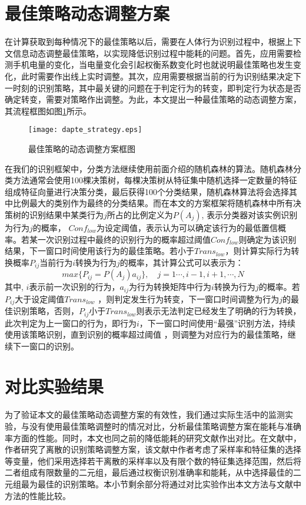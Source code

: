 \section{最佳策略动态调整方案}
\par 在计算获取到每种情况下的最佳策略以后，需要在人体行为识别过程中，根据上下文信息动态调整最佳策略，以实现降低识别过程中能耗的问题。首先，应用需要检测手机电量的变化，当电量变化会引起权衡系数变化时也就说明最佳策略也发生变化，此时需要作出线上实时调整。其次，应用需要根据当前的行为识别结果决定下一时刻的识别策略，其中最关键的问题在于判定行为的转变，即判定行为状态是否确定转变，需要对策略作出调整。为此，本文提出一种最佳策略的动态调整方案，其流程框图如图\ref{dapte_strategy}所示。
\begin{figure}[ht]
\centering
\texttt{[image: dapte\_strategy.eps]}
\caption{最佳策略的动态调整方案框图}\label{dapte_strategy}
\end{figure}

\par 在我们的识别框架中，分类方法继续使用前面介绍的随机森林的算法。随机森林分类方法通常会使用100棵决策树，每棵决策树从特征集中随机选择一定数量的特征组成特征向量进行决策分类，最后获得100个分类结果，随机森林算法将会选择其中比例最大的类别作为最终的分类结果。而在本文的方案框架将随机森林中所有决策树的识别结果中某类行为$j$所占的比例定义为$P(A_j)$, 表示分类器对该实例识别为行为$j$的概率， $Conf_{low}$为设定阈值，表示认为可以确定该行为的最低置信概率。若某一次识别过程中最终的识别行为的概率超过阈值$Conf_{low}$则确定为该识别结果，下一窗口时间使用该行为的最佳策略。若小于$Trans_{low}$，则计算实际行为转换概率$P_{ij}$当前行为$i$转换为行为$j$的概率，其计算公式可以表示为：
\begin{equation}
	max \{P_{ij} = P(A_j)a_{ij}\}, \quad j = 1 \cdots, i-1, i+1, \cdots, N
\end{equation}
其中, $i$表示前一次识别的行为，$a_{ij}$为行为转换矩阵中行为$i$转换为行为$j$的概率。若$P_{ij}$大于设定阈值$Trans_{low}$ ，则判定发生行为转变，下一窗口时间调整为行为$j$的最佳识别策略，否则，$P_{ij}$小于$Trans_{low}$则表示无法判定已经发生了明确的行为转换，此次判定为上一窗口的行为，即行为$i$，下一窗口时间使用“最强”识别方法，持续使用该策略识别，直到识别的概率超过阈值 ，则调整为对应行为的最佳策略，继续下一窗口的识别。

\section{对比实验结果}
\par 为了验证本文的最佳策略动态调整方案的有效性，我们通过实际生活中的监测实验，与没有使用最佳策略调整时的情况对比，分析最佳策略调整方案在能耗与准确率方面的性能。同时，本文也同之前的降低能耗的研究文献作出对比。在文献\cite{modelVarialb}中，作者研究了离散的识别策略调整方案，该文献中作者考虑了采样率和特征集的选择等变量，他们采用选择若干离散的采样率以及有限个数的特征集选择范围，然后将二者组成有限数量的二元组，最后通过权衡识别准确率和能耗，从中选择最佳的二元组最为最佳的识别策略。本小节剩余部分将通过对比实验作出本文方法与文献中方法的性能比较。

